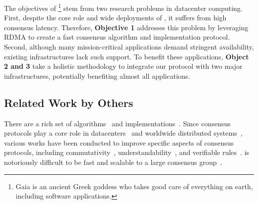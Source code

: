The objectives of \xxx\footnote{Gaia is an ancient Greek goddess who takes good 
care of everything on earth, including software applications.} stem from two 
research problems in datacenter computing. First, despite the core role and 
wide deployments of \paxos, it suffers from high consensus latency. Therefore, 
\textbf{Objective 1} addresses this problem by leveraging RDMA to create a 
fast consensus algorithm and implementation protocol. Second, although many 
mission-critical applications demand stringent availability, existing 
infrastructures lack such support. To benefit these applications, 
\textbf{Object 2 and 3} take a holistic methodology to integrate our protocol 
with two major infrastructures, potentially benefiting almost all applications.


\subsection{Related Work by Others} 
\label{sec:others-work}\vspace{-.075in}

There are a rich set of \paxos 
algorithms~\cite{paxos:practical,paxos,paxos:simple,paxos:complex,
epaxos:sosp13} 
and implementations~\cite{paxos:live,paxos:practical,chubby:osdi,crane:sosp15}. 
Since consensus protocols play a core role in 
datacenters~\cite{matei:hotcloud11, mesos:nsdi11, 
datacenter:os} and worldwide 
distributed systems~\cite{spanner:osdi12,mencius:osdi08}, various works 
have been conducted to improve specific aspects of consensus protocols, 
including commutativity~\cite{epaxos:sosp13}, 
understandability~\cite{raft:usenix14,paxos}, and verifiable 
rules~\cite{modist:nsdi09,demeter:sosp11}. \paxos is notoriously difficult to be 
fast and scalable to a large consensus 
group~\cite{ellis:thesis,manos:hotdep10,scatter:sosp11}. 

